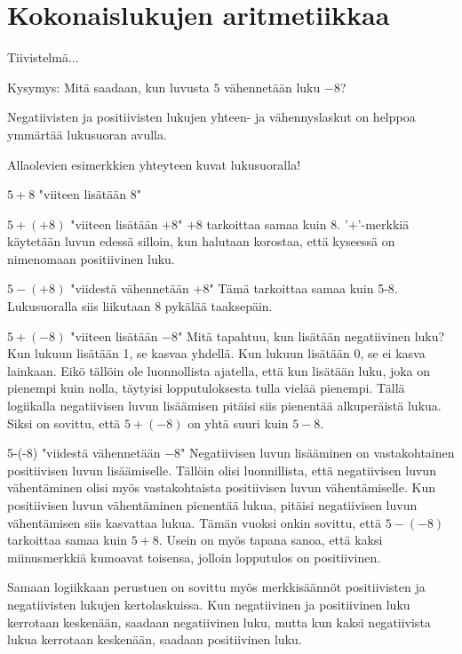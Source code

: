 \chapter{Kokonaislukujen aritmetiikkaa}

Tiivistelmä...

Kysymys: Mitä saadaan, kun luvusta $5$ vähennetään luku $-8$?

Negatiivisten ja positiivisten lukujen yhteen- ja vähennyslaskut on helppoa ymmärtää lukusuoran avulla.

Allaolevien esimerkkien yhteyteen kuvat lukusuoralla!

$5+8$ "viiteen lisätään $8$"


$5+(+8)$ "viiteen lisätään $+8$" $+8$ tarkoittaa samaa kuin $8$. '$+$'-merkkiä käytetään luvun edessä silloin, kun halutaan korostaa, että kyseessä on nimenomaan positiivinen luku.

$5-(+8)$ "viidestä vähennetään $+8$" Tämä tarkoittaa samaa kuin 5-8. Lukusuoralla siis liikutaan 8 pykälää taaksepäin.

$5+(-8)$ "viiteen lisätään $-8$" Mitä tapahtuu, kun lisätään negatiivinen luku? Kun lukuun lisätään 1, se kasvaa yhdellä. Kun lukuun lisätään 0, se ei kasva lainkaan. Eikö tällöin ole luonnollista ajatella, että kun lisätään luku, joka on pienempi kuin nolla, täytyisi lopputuloksesta tulla vielää pienempi. Tällä logiikalla negatiivisen luvun lisäämisen pitäisi siis pienentää alkuperäistä lukua. Siksi on sovittu, että $5+(-8)$ on yhtä suuri kuin $5-8$.

5-(-8) "viidestä vähennetään $-8$" Negatiivisen luvun lisääminen on vastakohtainen positiivisen luvun lisäämiselle. Tällöin olisi luonnillista, että negatiivisen luvun vähentäminen olisi myös vastakohtaista positiivisen luvun vähentämiselle. Kun positiivisen luvun vähentäminen pienentää lukua, pitäisi negatiivisen luvun vähentämisen siis kasvattaa lukua. Tämän vuoksi onkin sovittu, että $5-(-8)$ tarkoittaa samaa kuin $5+8$. Usein on myös tapana sanoa, että kaksi miinusmerkkiä kumoavat toisensa, jolloin lopputulos on positiivinen.

Samaan logiikkaan perustuen on sovittu myös merkkisäännöt positiivisten ja negatiivisten lukujen kertolaskuissa. Kun negatiivinen ja positiivinen luku kerrotaan keskenään, saadaan negatiivinen luku, mutta kun kaksi negatiivista lukua kerrotaan keskenään, saadaan positiivinen luku.

